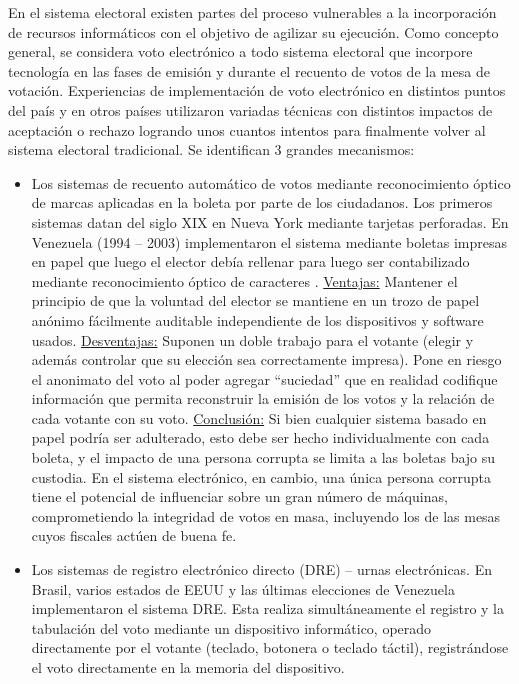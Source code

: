 En el sistema electoral existen partes del proceso vulnerables a la incorporación de recursos informáticos con el objetivo de agilizar su ejecución. Como concepto general, se considera voto electrónico a todo sistema electoral que incorpore tecnología en las fases de emisión y durante el recuento de votos de la mesa de votación. Experiencias de implementación de voto electrónico en distintos puntos del país y en otros países utilizaron variadas técnicas con distintos impactos de aceptación o rechazo logrando unos cuantos intentos para finalmente volver al sistema electoral tradicional.\newline
Se identifican 3 grandes mecanismos:
\begin{itemize}
    \item Los sistemas de recuento automático de votos mediante reconocimiento óptico de marcas aplicadas en la boleta por parte de los ciudadanos.	Los primeros sistemas datan del siglo XIX en Nueva York mediante tarjetas perforadas. En Venezuela (1994 – 2003) implementaron el sistema mediante boletas impresas en papel que luego el elector debía rellenar para luego ser contabilizado mediante reconocimiento óptico de caracteres \cite{eleccionesVenezuela}.\newline
    \underline{Ventajas:} Mantener el principio de que la voluntad del elector se mantiene en un trozo de papel anónimo fácilmente auditable independiente de los dispositivos y software usados.\newline
    \underline{Desventajas:} Suponen un doble trabajo para el votante (elegir y además controlar que su elección sea correctamente impresa). Pone en riesgo el anonimato del voto al poder agregar “suciedad” que en realidad codifique información que permita reconstruir la emisión de los votos y la relación de cada votante con su voto.\newline
    \underline{Conclusión:} Si bien cualquier sistema basado en papel podría ser adulterado, esto debe ser hecho individualmente con cada boleta, y el impacto de una persona corrupta se limita a las boletas bajo su custodia. En el sistema electrónico, en cambio, una única persona corrupta tiene el potencial de influenciar sobre un gran número de máquinas, comprometiendo la integridad de votos en masa, incluyendo los de las mesas cuyos fiscales actúen de buena fe.
    \item Los sistemas de registro electrónico directo (DRE) – urnas electrónicas. En Brasil, varios estados de EEUU y las últimas elecciones de Venezuela implementaron el sistema DRE. Esta realiza simultáneamente el registro y la tabulación del voto mediante un dispositivo informático, operado directamente por el votante (teclado, botonera o teclado táctil), registrándose el voto directamente en la memoria del dispositivo.\newline

\end{itemize}
